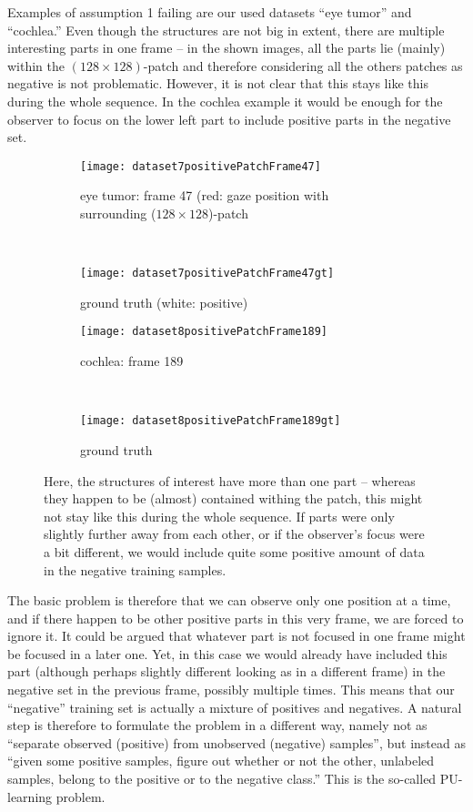 Examples of assumption 1 failing are our used datasets ``eye tumor'' and ``cochlea.'' Even though the structures are not big in extent, there are multiple interesting parts in one frame -- in the shown images, all the parts lie (mainly) within the $(128\times128)$-patch and therefore considering all the others patches as negative is not problematic. 
However, it is not clear that this stays like this during the whole sequence. 
In the cochlea example it would be enough for the observer to focus on the lower left part to include positive parts in the negative set. 

\begin{figure}[ht]
	\centering
	\begin{subfigure}[h]{0.48\textwidth}
		\texttt{[image: dataset7positivePatchFrame47]}
		\caption*{eye tumor: frame 47 (red: gaze position with surrounding ($128\times128$)-patch}
	\end{subfigure}
	~
	\begin{subfigure}[h]{0.48\textwidth}
	    \texttt{[image: dataset7positivePatchFrame47gt]}
	    \caption*{ground truth (white: positive) \newline}
	\end{subfigure}
	
	\vspace{3mm}
	\begin{subfigure}[h]{0.48\textwidth}
		\texttt{[image: dataset8positivePatchFrame189]}	
		\caption*{cochlea: frame 189}
	\end{subfigure}
	~
	\begin{subfigure}[h]{0.48\textwidth}
		\texttt{[image: dataset8positivePatchFrame189gt]}	
		\caption*{ground truth}
	\end{subfigure}
	\caption{Here, the structures of interest have more than one part -- whereas they happen to be (almost) contained withing the patch, this might not stay like this during the whole sequence. If parts were only slightly further away from each other, or if the observer's focus were a bit different, we would include quite some positive amount of data in the negative training samples.}
	\label{fig:nonValidAssumptionD78}
\end{figure}

The basic problem is therefore that we can observe only one position at a time, and if there happen to be other positive parts in this very frame, we are forced to ignore it. 
It could be argued that whatever part is not focused in one frame might be focused in a later one. 
Yet, in this case we would already have included this part (although perhaps slightly different looking as in a different frame) in the negative set in the previous frame, possibly multiple times. 
This means that our ``negative'' training set is actually a mixture of positives and negatives.
A natural step is therefore to formulate the problem in a different way, namely not as ``separate observed (positive) from unobserved (negative) samples'', but instead as ``given some positive samples, figure out whether or not the other, unlabeled samples, belong to the positive or to the negative class.'' This is the so-called PU-learning problem.

